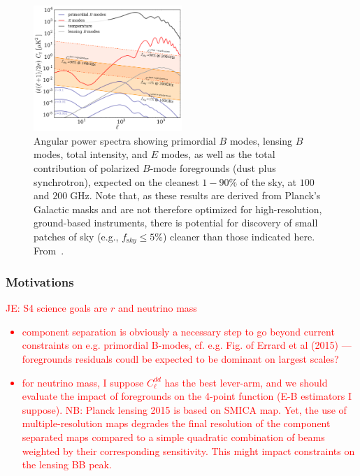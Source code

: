 \begin{figure}[htbp]
\centering
\includegraphics[width=0.5\textwidth]{Analysis/Power_Spectrum_figure_showing_foregrounds.pdf}
\caption{Angular power spectra showing primordial $B$ modes, lensing $B$ modes, total intensity, and $E$ modes, as well as the total contribution of polarized $B$-mode foregrounds (dust plus synchrotron), expected on the cleanest $1-90\%$ of the sky, at $100$ and $200\;$GHz. Note that, as these results are derived from Planck's Galactic masks and are not therefore optimized for high-resolution, ground-based instruments, there is potential for discovery of small patches of sky (e.g., $f_{\mathrm sky} \leq 5\%$) cleaner than those indicated here. From~\cite{}.}
\label{default}
\end{figure}


\subsubsection{Motivations}

\textcolor{red}{JE: S4 science goals are $r$ and neutrino mass
\begin{itemize}
	\item component separation is obviously a necessary step to go beyond current constraints on e.g. primordial B-modes, cf. e.g. Fig.  of Errard et al (2015) --- foregrounds residuals coudl be expected to be dominant on largest scales?
	\item for neutrino mass, I suppose $C_\ell^{dd}$ has the best lever-arm, and we should evaluate the impact of foregrounds on the 4-point function (E-B estimators I suppose). NB: Planck lensing 2015 is based on SMICA map. Yet, the use of multiple-resolution maps degrades the final resolution of the component separated maps compared to a simple quadratic combination of beams weighted by their corresponding sensitivity. This might impact constraints on the lensing BB peak.
\end{itemize}}

